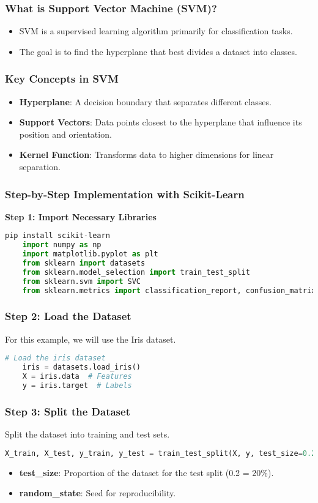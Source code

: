 \documentclass[aspectratio=169]{beamer}
\begin{document}
\begin{frame}
    \frametitle{What is Support Vector Machine (SVM)?}
    \begin{itemize}
        \item SVM is a supervised learning algorithm primarily for classification tasks.
        \item The goal is to find the hyperplane that best divides a dataset into classes.
    \end{itemize}
\end{frame}

\begin{frame}
    \frametitle{Key Concepts in SVM}
    \begin{itemize}
        \item \textbf{Hyperplane}: A decision boundary that separates different classes.
        \item \textbf{Support Vectors}: Data points closest to the hyperplane that influence its position and orientation.
        \item \textbf{Kernel Function}: Transforms data to higher dimensions for linear separation.
    \end{itemize}
\end{frame}

\begin{frame}[fragile]
    \frametitle{Step-by-Step Implementation with Scikit-Learn}
    \textbf{Step 1: Import Necessary Libraries}
    \begin{lstlisting}[language=Python]
    pip install scikit-learn
    import numpy as np
    import matplotlib.pyplot as plt
    from sklearn import datasets
    from sklearn.model_selection import train_test_split
    from sklearn.svm import SVC
    from sklearn.metrics import classification_report, confusion_matrix
    \end{lstlisting}
\end{frame}

\begin{frame}[fragile]
    \frametitle{Step 2: Load the Dataset}
    For this example, we will use the Iris dataset.
    \begin{lstlisting}[language=Python]
    # Load the iris dataset
    iris = datasets.load_iris()
    X = iris.data  # Features
    y = iris.target  # Labels
    \end{lstlisting}
\end{frame}

\begin{frame}[fragile]
    \frametitle{Step 3: Split the Dataset}
    Split the dataset into training and test sets.
    \begin{lstlisting}[language=Python]
    X_train, X_test, y_train, y_test = train_test_split(X, y, test_size=0.2, random_state=42)
    \end{lstlisting}
    \begin{itemize}
        \item \textbf{test\_size}: Proportion of the dataset for the test split (0.2 = 20\%).
        \item \textbf{random\_state}: Seed for reproducibility.
    \end{itemize}
\end{frame}
\end{document}
